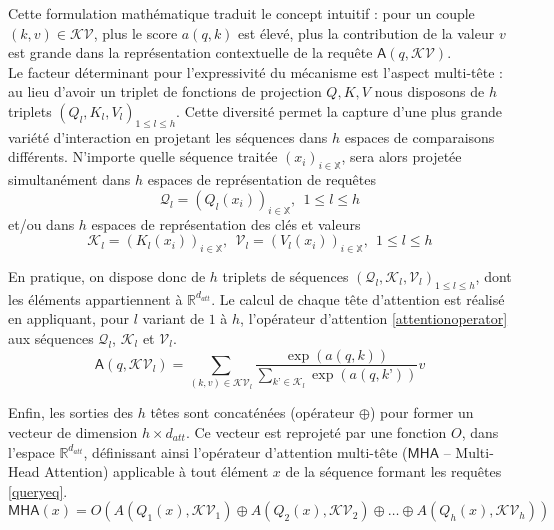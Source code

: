 Cette formulation mathématique traduit le concept intuitif : pour un couple $(k,v) \in \mathcal{KV}$, plus le score $a(q,k)$ est élevé, plus la contribution de la valeur $v$ est grande dans la représentation contextuelle de la requête $\mathsf{A}(q, \mathcal{KV})$.\\

Le facteur déterminant pour l'expressivité du mécanisme est l'aspect multi-tête : au lieu d’avoir un triplet de fonctions de projection $Q,K,V$ nous disposons de $h$ triplets $(Q_l,K_l,V_l)_{1 \le l \le h}$. Cette diversité permet la capture d'une plus grande variété d'interaction en projetant les séquences dans $h$ espaces de comparaisons différents.
N'importe quelle séquence traitée $(x_i)_{i \in \mathbb{X}}$, sera alors projetée simultanément dans $h$ espaces de représentation de requêtes
\begin{equation}
\mathcal{Q}_l =(Q_l(x_i))_{i \in \mathbb{X}}, \:\: 1 \le l \le h
\label{queryeq}
\end{equation}
et/ou dans $h$ espaces de représentation des clés et valeurs
\begin{equation}
\mathcal{K}_l = (K_l(x_i))_{i \in \mathbb{X}},\:\: \mathcal{V}_l  = (V_l(x_i))_{i \in \mathbb{X}},\:\: 1 \le l \le h
\end{equation}

En pratique, on dispose donc de $h$ triplets de séquences $(\mathcal{Q}_l,\mathcal{K}_l,\mathcal{V}_l)_{1 \le l \le h}$, dont les éléments appartiennent à $\mathbb{R}^{d_{att}}$.
Le calcul de chaque tête d'attention est réalisé en appliquant, pour $l$ variant de $1$ à $h$, l'opérateur d'attention \ref{attentionoperator} aux séquences $\mathcal{Q}_l$, $\mathcal{K}_l$ et $\mathcal{V}_l$.
$$ \mathsf{A}(q, \mathcal{KV}_l) = \sum_{(k, v) \in \mathcal{KV}_l} \frac{\exp(a(q, k))}{\sum_{k’ \in \mathcal{K}_l}\exp(a(q,k’))} v $$

Enfin, les sorties des $h$ têtes sont concaténées (opérateur $\oplus$) pour former un vecteur de dimension $h \times d_{att}$. Ce vecteur est reprojeté par une fonction $O$, dans l'espace $\mathbb{R}^{d_{att}}$, définissant ainsi l'opérateur d'attention multi-tête ($\mathsf{MHA}$ – Multi-Head Attention) applicable à tout élément $x$ de la séquence formant les requêtes \eqref{queryeq}.
\begin{equation}
\mathsf{MHA}(x) = O( A(Q_1(x), \mathcal{KV}_1) \oplus A(Q_2(x), \mathcal{KV}_2) \oplus \dots \oplus A(Q_h(x), \mathcal{KV}_h))
\label{MHAeq}
\end{equation}
\: \\

